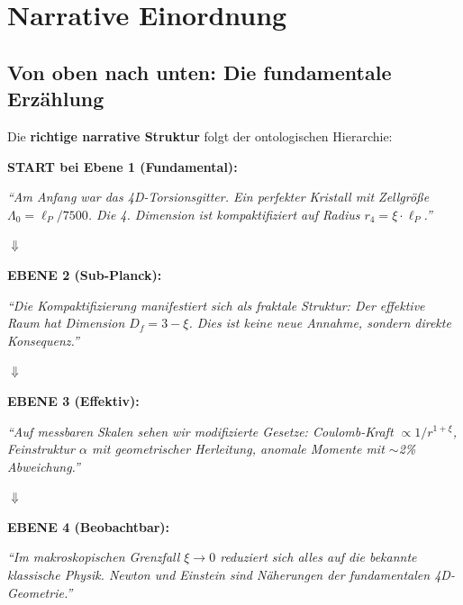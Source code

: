 	\section{Narrative Einordnung}
	
	\subsection{Von oben nach unten: Die fundamentale Erzählung}
	
	Die \textbf{richtige narrative Struktur} folgt der ontologischen Hierarchie:
	
	\begin{revolutionary}
		\textbf{START bei Ebene 1 (Fundamental):}
		
		\vspace{0.3cm}
		
		\textit{\enquote{Am Anfang war das 4D-Torsionsgitter. Ein perfekter Kristall mit Zellgröße $\Lambda_0 = \ell_P/7500$. Die 4. Dimension ist kompaktifiziert auf Radius $r_4 = \xi \cdot \ell_P$.}}
		
		\vspace{0.3cm}
		
		$\Downarrow$
		
		\vspace{0.3cm}
		
		\textbf{EBENE 2 (Sub-Planck):}
		
		\textit{\enquote{Die Kompaktifizierung manifestiert sich als fraktale Struktur: Der effektive Raum hat Dimension $D_f = 3-\xi$. Dies ist keine neue Annahme, sondern direkte Konsequenz.}}
		
		\vspace{0.3cm}
		
		$\Downarrow$
		
		\vspace{0.3cm}
		
		\textbf{EBENE 3 (Effektiv):}
		
		\textit{\enquote{Auf messbaren Skalen sehen wir modifizierte Gesetze: Coulomb-Kraft $\propto 1/r^{1+\xi}$, Feinstruktur $\alpha$ mit geometrischer Herleitung, anomale Momente mit $\sim$2\% Abweichung.}}
		
		\vspace{0.3cm}
		
		$\Downarrow$
		
		\vspace{0.3cm}
		
		\textbf{EBENE 4 (Beobachtbar):}
		
		\textit{\enquote{Im makroskopischen Grenzfall $\xi \to 0$ reduziert sich alles auf die bekannte klassische Physik. Newton und Einstein sind Näherungen der fundamentalen 4D-Geometrie.}}
	\end{revolutionary}
	
